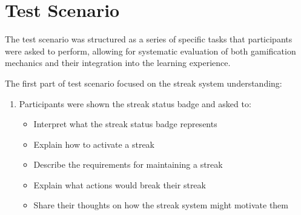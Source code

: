 \section{Test Scenario}
\label{sec:test-scenario}
The test scenario was structured as a series of specific tasks that participants were asked to perform, allowing for systematic evaluation of both gamification mechanics and their integration into the learning experience.

The first part of test scenario focused on the streak system understanding:

\begin{enumerate}
    \item Participants were shown the streak status badge and asked to:
    \begin{itemize}
        \item Interpret what the streak status badge represents
        \item Explain how to activate a streak
        \item Describe the requirements for maintaining a streak
        \item Explain what actions would break their streak
        \item Share their thoughts on how the streak system might motivate them
    \end{itemize}
\end{enumerate}
    


